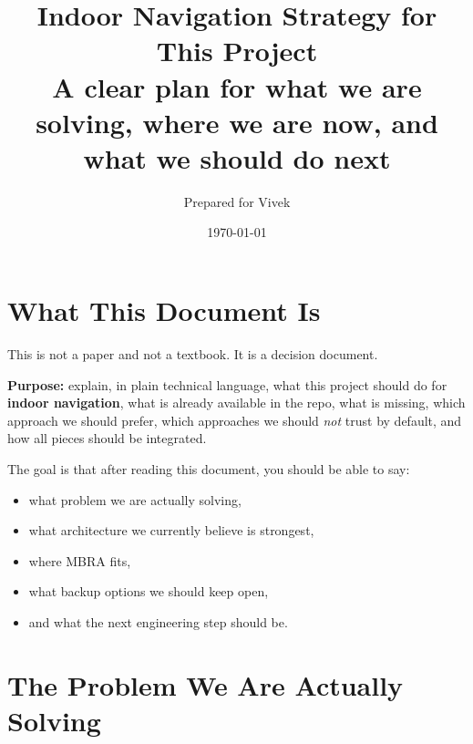 \documentclass[11pt,a4paper]{article}
\title{Indoor Navigation Strategy for This Project\\[0.3em]
\large A clear plan for what we are solving, where we are now, and what we should do next}
\author{Prepared for Vivek}
\date{\today}
\begin{document}
\maketitle
\begin{center}
\end{center}
\vspace{1em}
\tableofcontents
\newpage

\section{What This Document Is}

This is not a paper and not a textbook. It is a decision document.

\begin{mdframed}
\textbf{Purpose:} explain, in plain technical language, what this project
should do for \textbf{indoor navigation}, what is already available in the
repo, what is missing, which approach we should prefer, which approaches we
should \emph{not} trust by default, and how all pieces should be integrated.
\end{mdframed}

The goal is that after reading this document, you should be able to say:
\begin{itemize}[nosep]
  \item what problem we are actually solving,
  \item what architecture we currently believe is strongest,
  \item where MBRA fits,
  \item what backup options we should keep open,
  \item and what the next engineering step should be.
\end{itemize}


\section{The Problem We Are Actually Solving}
\end{document}
